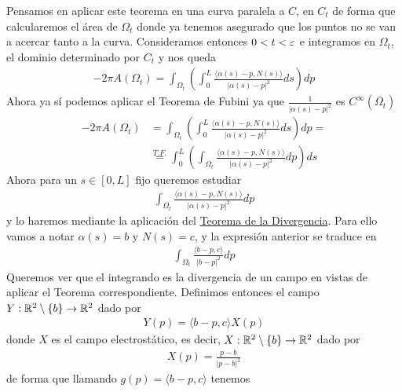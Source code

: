 \begin{observacion}
\begin{enumerate}[start=4]
        Pensamos en aplicar este teorema en una curva paralela a $C$, en $C_t$ de forma que calcularemos el área de $\Omega_t$ donde ya tenemos asegurado que los puntos no se van a acercar tanto a la curva. Consideramos entonces $0<t<\varepsilon$ e integramos en $\Omega_t$, el dominio determinado por $C_t$ y nos queda
        \begin{gather*}
            -2\pi A(\Omega_t) = \int_{\Omega_t} \left(\int_0^L \frac{\langle \alpha(s) - p, N(s) \rangle}{|\alpha(s) - p|^2} ds \right) dp
        \end{gather*}
        Ahora ya sí podemos aplicar el Teorema de Fubini ya que $\frac{1}{|\alpha(s) - p|^2}$ es $C^\infty(\overline{\Omega_t})$
        \begin{align*}
            -2\pi A(\Omega_t) &= 
            \int_{\Omega_t} \left(\int_0^L \frac{\langle \alpha(s) - p, N(s) \rangle}{|\alpha(s) - p|^2} ds \right) dp = \\
            &\overset{T.F.}{=}
            \int_0^L \left(\int_{\Omega_t} \frac{\langle \alpha(s) - p, N(s) \rangle}{|\alpha(s) - p|^2} dp \right) ds
        \end{align*}
        Ahora para un $s\in [0,L]$ fijo queremos estudiar
        \begin{gather*}
            \int_{\Omega_t} \frac{\langle \alpha(s) - p, N(s) \rangle}{|\alpha(s) - p|^2} dp
        \end{gather*}
        y lo haremos mediante la aplicación del \hyperref[teo:divergencia]{Teorema de la Divergencia}. Para ello vamos a notar $\alpha(s)=b$ y $N(s)=c$, y la expresión anterior se traduce en
        \begin{gather*}
            \int_{\Omega_t} \frac{\langle b - p, c \rangle}{|b - p|^2} dp
        \end{gather*}
        Queremos ver que el integrando es la divergencia de un campo en vistas de aplicar el Teorema correspondiente. Definimos entonces el campo $Y:\mathbb{R}^2\setminus\{b\} \to \mathbb{R}^2$ dado por 
        \begin{gather*}
            Y(p) = \langle b-p, c \rangle X(p)
        \end{gather*}
        donde $X$ es el campo electrostático, es decir, $X:\mathbb{R}^2\setminus\{b\} \to \mathbb{R}^2$ dado por
        \begin{gather*}
            X(p) = \frac{p-b}{|p-b|^2}
        \end{gather*}
        de forma que llamando $g(p)=\langle b-p, c \rangle$ tenemos
        \begin{gather*}

\end{gather*}
\end{enumerate}
\end{observacion}
